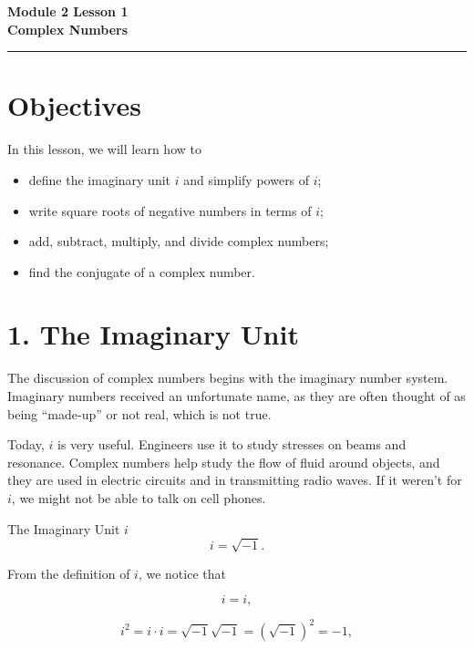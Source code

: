 \documentclass[12pt]{article}
\begin{document}
\handwriting

\begin{center}
    \Large\textbf{\color{primaryblue}Module 2 Lesson 1\\Complex Numbers} \\
    \vspace{0.2cm}
    \hrule
\end{center}

\section*{Objectives}

\begin{friendlyrule}{In this lesson, we will learn how to}
\begin{itemize}
    \item define the imaginary unit $i$ and simplify powers of $i$;
    \item write square roots of negative numbers in terms of $i$;
    \item add, subtract, multiply, and divide complex numbers;
    \item find the conjugate of a complex number.
\end{itemize}
\end{friendlyrule}

\section*{1. The Imaginary Unit}

The discussion of complex numbers begins with the imaginary number system. Imaginary numbers received an unfortunate name, as they are often thought of as being ``made-up'' or not real, which is not true.

Today, $i$ is very useful. Engineers use it to study stresses on beams and resonance. Complex numbers help study the flow of fluid around objects, and they are used in electric circuits and in transmitting radio waves. If it weren't for $i$, we might not be able to talk on cell phones.

\begin{friendlyrule}{The Imaginary Unit $i$}
\[
i=\sqrt{-1}.
\]
\end{friendlyrule}

From the definition of $i$, we notice that

\[
i=i,
\]

\[
i^2=i\cdot i=\sqrt{-1}\sqrt{-1}=\left(\sqrt{-1}\right)^2=-1,
\]
\end{document}
